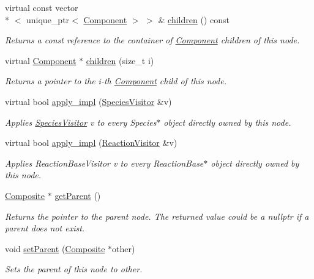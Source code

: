 \begin{DoxyCompactItemize}
virtual const vector\\*
$<$ unique\+\_\+ptr$<$ \hyperlink{classComponent}{Component} $>$ $>$ \& \hyperlink{classComposite_a7824aae77c582d72a2e8b403f2636385}{children} () const 
\begin{DoxyCompactList}\small\item\em Returns a const reference to the container of \hyperlink{classComponent}{Component} children of this node. \end{DoxyCompactList}\item 
virtual \hyperlink{classComponent}{Component} $\ast$ \hyperlink{classComposite_af2073a61c00153c28cab3a29926ea060}{children} (size\+\_\+t i)
\begin{DoxyCompactList}\small\item\em Returns a pointer to the i-\/th \hyperlink{classComponent}{Component} child of this node. \end{DoxyCompactList}\item 
virtual bool \hyperlink{classComponent_a20f6f5a1f7da3238c069dfc35f174a4b}{apply\+\_\+impl} (\hyperlink{classSpeciesVisitor}{Species\+Visitor} \&v)
\begin{DoxyCompactList}\small\item\em Applies \hyperlink{classSpeciesVisitor}{Species\+Visitor} v to every Species$\ast$ object directly owned by this node. \end{DoxyCompactList}\item 
virtual bool \hyperlink{classComponent_ac9296f41e0b9c254d5adea9df3b4b07a}{apply\+\_\+impl} (\hyperlink{classReactionVisitor}{Reaction\+Visitor} \&v)
\begin{DoxyCompactList}\small\item\em Applies Reaction\+Base\+Visitor v to every Reaction\+Base$\ast$ object directly owned by this node. \end{DoxyCompactList}\item 
\hyperlink{classComposite}{Composite} $\ast$ \hyperlink{classComponent_a4bb9041a7f3854f25f45060e81bb4e4e}{get\+Parent} ()
\begin{DoxyCompactList}\small\item\em Returns the pointer to the parent node. The returned value could be a nullptr if a parent does not exist. \end{DoxyCompactList}\item 
void \hyperlink{classComponent_a9d5b03697a653cda24d5688af1d105f8}{set\+Parent} (\hyperlink{classComposite}{Composite} $\ast$other)
\begin{DoxyCompactList}\small\item\em Sets the parent of this node to other. \end{DoxyCompactList}\item 

\end{DoxyCompactItemize}
